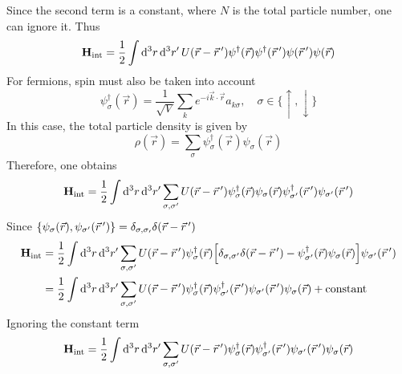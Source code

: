 \documentclass[12pt,a4paper,titlepage]{article}
\newcommand{\trm}[1]{\textrm{#1}} %
\newcommand{\up}{\uparrow} %
\newcommand{\dn}{\downarrow} %
\begin{document}
Since the second term is a constant, where $N$ is the total particle number, one can ignore it. Thus
\begin{equation}
\vb{H}_{\trm{int}}=\frac{1}{2}\int\dd[3]{r}\dd[3]{r^{\prime}}U(\vec{r}-\vec{r}\,')\psi^{\dagger}(\vec{r})\psi^{\dagger}(\vec{r}\,')\psi(\vec{r}\,')\psi(\vec{r})
\end{equation}
For fermions, spin must also be taken into account
\begin{equation}
\psi^{\dagger}_{\sigma}(\vec{r})=\frac{1}{\sqrt{V}}\sum_{k}e^{-i\vec{k}\cdot\vec{r}}a_{k\sigma},\quad\sigma\in\{\up,\dn\}
\end{equation}
In this case, the total particle density is given by
\begin{equation}
\rho(\vec{r})=\sum_{\sigma}\psi^{\dagger}_{\sigma}(\vec{r})\psi_{\sigma}(\vec{r})
\end{equation}
Therefore, one obtains
\begin{equation}
\vb{H}_{\trm{int}}=\frac{1}{2}\int\dd[3]{r}\dd[3]{r^{\prime}}\sum_{\sigma,\sigma^{\prime}}U(\vec{r}-\vec{r}\,')\psi_{\sigma}^{\dagger}(\vec{r})\psi_{\sigma}(\vec{r})\psi_{\sigma^{\prime}}^{\dagger}(\vec{r}\,')\psi_{\sigma^{\prime}}(\vec{r}\,')
\end{equation}
Since $\acomm{\psi_{\sigma}(\vec{r})}{\psi_{\sigma^{\prime}}(\vec{r}\,')}=\delta_{\sigma,\sigma_{\prime}}\delta(\vec{r}-\vec{r}\,')$
\begin{equation}
\begin{aligned}
\vb{H}_{\trm{int}}&=\frac{1}{2}\int\dd[3]{r}\dd[3]{r'}\sum_{\sigma,\sigma^{\prime}}U(\vec{r}-\vec{r}\,')\psi_{\sigma}^{\dagger}(\vec{r})\qty[\delta_{\sigma,\sigma^{\prime}}\delta(\vec{r}-\vec{r}\,')-\psi_{\sigma^{\prime}}^{\dagger}(\vec{r})\psi_{\sigma}(\vec{r})]\psi_{\sigma^{\prime}}(\vec{r}\,')\\
&=\frac{1}{2}\int\dd[3]{r}\dd[3]{r^{\prime}}\sum_{\sigma,\sigma^{\prime}}U(\vec{r}-\vec{r}\,')\psi_{\sigma}^{\dagger}(\vec{r})\psi_{\sigma^{\prime}}^{\dagger}(\vec{r}\,')\psi_{\sigma^{\prime}}(\vec{r}\,')\psi_{\sigma}(\vec{r})+\trm{constant}
\end{aligned}
\end{equation}
Ignoring the constant term
\begin{equation}
\vb{H}_{\trm{int}}=\frac{1}{2}\int\dd[3]{r}\dd[3]{r^{\prime}}\sum_{\sigma,\sigma^{\prime}}U(\vec{r}-\vec{r}\,')\psi_{\sigma}^{\dagger}(\vec{r})\psi_{\sigma^{\prime}}^{\dagger}(\vec{r}\,')\psi_{\sigma^{\prime}}(\vec{r}\,')\psi_{\sigma}(\vec{r})
\end{equation}
\end{document}
